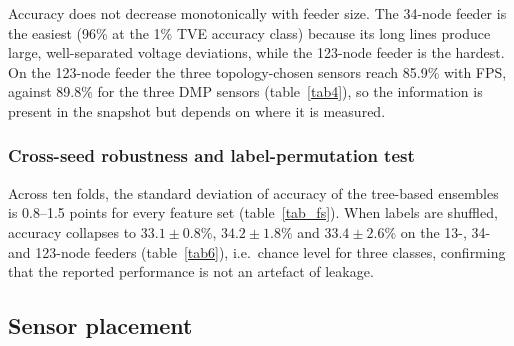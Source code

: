 \documentclass[11pt]{article}
\newenvironment{nw}{}{}
\begin{document}
\begin{nw}

Accuracy does not decrease monotonically with feeder size. The 34-node feeder is the easiest (96\% at the 1\% TVE accuracy class) because its long lines produce large, well-separated voltage deviations, while the 123-node feeder is the hardest. On the 123-node feeder the three topology-chosen sensors reach 85.9\% with FPS, against 89.8\% for the three DMP sensors (table~\ref{tab4}), so the information is present in the snapshot but depends on where it is measured.
\end{nw}

\subsubsection{Cross-seed robustness and label-permutation test}\label{subsec5_3}

\begin{nw}
Across ten folds, the standard deviation of accuracy of the tree-based ensembles is 0.8--1.5 points for every feature set (table~\ref{tab_fs}). When labels are shuffled, accuracy collapses to $33.1\pm0.8\%$, $34.2\pm1.8\%$ and $33.4\pm2.6\%$ on the 13-, 34- and 123-node feeders (table~\ref{tab6}), i.e.\ chance level for three classes, confirming that the reported performance is not an artefact of leakage.
\end{nw}

\subsection{Sensor placement}\label{subsec5_1}
\end{document}
